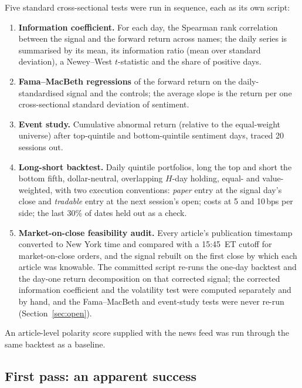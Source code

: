 \documentclass[11pt,letterpaper]{article}
\newcommand{\bps}{\,bps}
\begin{document}
Five standard cross-sectional tests were run in sequence, each as its own script:
\begin{enumerate}
  \item \textbf{Information coefficient.} For each day, the Spearman rank correlation between
        the signal and the forward return across names; the daily series is summarised by its
        mean, its information ratio (mean over standard deviation), a Newey--West
        $t$-statistic \cite{newey1987} and the share of positive days.
  \item \textbf{Fama--MacBeth regressions} \cite{fama1973} of the forward return on the
        daily-standardised signal and the controls; the average slope is the return per one
        cross-sectional standard deviation of sentiment.
  \item \textbf{Event study.} Cumulative abnormal return (relative to the equal-weight universe)
        after top-quintile and bottom-quintile sentiment days, traced 20 sessions out.
  \item \textbf{Long-short backtest.} Daily quintile portfolios, long the top and short the
        bottom fifth, dollar-neutral, overlapping $H$-day holding, equal- and value-weighted,
        with two execution conventions: \emph{paper} entry at the signal day's close and
        \emph{tradable} entry at the next session's open; costs at 5 and 10\bps{} per side; the
        last 30\% of dates held out as a check.
  \item \textbf{Market-on-close feasibility audit.} Every article's publication timestamp
        converted to New York time and compared with a 15:45~ET cutoff for market-on-close orders,
        and the signal rebuilt on the first close by which each article was knowable. The
        committed script re-runs the one-day backtest and the day-one return decomposition on
        that corrected signal; the corrected information coefficient and the volatility test
        were computed separately and by hand, and the Fama--MacBeth and event-study tests were
        never re-run (Section~\ref{sec:open}).
\end{enumerate}
An article-level polarity score supplied with the news feed was run through the same backtest as
a baseline.

\subsection{First pass: an apparent success}
\label{sec:firstpass}
\end{document}
